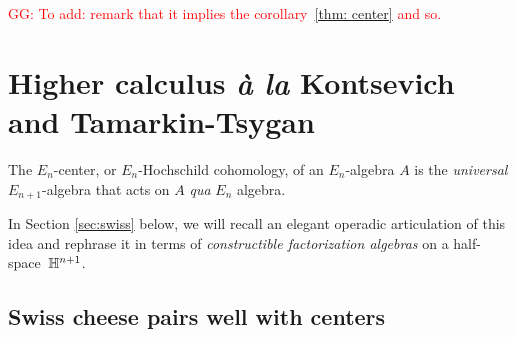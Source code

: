 \documentclass[11pt]{amsart}
\numberwithin{equation}{section}
\def\brian{\textcolor{blue}{BW: }\textcolor{blue}}
\def\greg{\textcolor{red}{GG: }\textcolor{red}}
\begin{document}
\greg{To add: remark that it implies the corollary~\ref{thm: center} and so.}

\section{Higher calculus {\it \`a la} Kontsevich and Tamarkin-Tsygan}
\label{sec: TT}

The $E_n$-center, or $E_n$-Hochschild cohomology, of an $E_n$-algebra $A$ is the {\em universal} $E_{n+1}$-algebra that acts on $A$ {\em qua} $E_n$ algebra. 

In Section \ref{sec:swiss} below, we will recall an elegant operadic articulation of this idea and rephrase it in terms of {\em constructible factorization algebras} on a half-space~$\mathbb H^{n+1}$. 

%
%
%
%


\subsection{Swiss cheese pairs well with centers}
\end{document}
